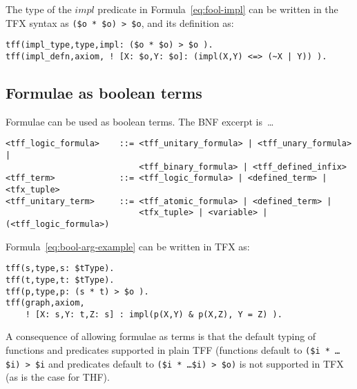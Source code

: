\documentclass{easychair}
\begin{document}
The type of the $\mathit{impl}$ predicate in Formula~\ref{eq:fool-impl} can 
be written in the TFX syntax as \verb'($o * $o) > $o', and its definition 
as:
\begin{verbatim}
tff(impl_type,type,impl: ($o * $o) > $o ).
tff(impl_defn,axiom, ! [X: $o,Y: $o]: (impl(X,Y) <=> (~X | Y)) ).
\end{verbatim}


\subsection{Formulae as boolean terms}

Formulae can be used as boolean terms. 
The BNF excerpt is~\ldots
\begin{verbatim}
<tff_logic_formula>    ::= <tff_unitary_formula> | <tff_unary_formula> |
                           <tff_binary_formula> | <tff_defined_infix>
<tff_term>             ::= <tff_logic_formula> | <defined_term> | <tfx_tuple>
<tff_unitary_term>     ::= <tff_atomic_formula> | <defined_term> |
                           <tfx_tuple> | <variable> | (<tff_logic_formula>)
\end{verbatim}

Formula~\ref{eq:bool-arg-example} can be written in TFX as:
\begin{verbatim}
tff(s,type,s: $tType).
tff(t,type,t: $tType).
tff(p,type,p: (s * t) > $o ).
tff(graph,axiom,
    ! [X: s,Y: t,Z: s] : impl(p(X,Y) & p(X,Z), Y = Z) ).
\end{verbatim}

A consequence of allowing formulae as terms is that the default typing of 
functions and predicates supported in plain TFF (functions default to 
{\tt (\$i * \ldots * \$i) > \$i} and predicates default to 
{\tt (\$i * \ldots * \$i) > \$o)} is not supported in TFX (as is the case 
for THF).
\end{document}
